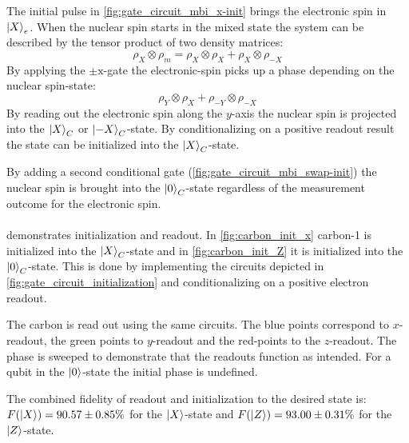 The initial pulse in \cref{fig:gate_circuit_mbi_x-init} brings the electronic spin in ${\left\vert{X}\right\rangle}_e$.
When the nuclear spin starts in the mixed state the system can be described by the tensor product of two density matrices:
\begin{equation}
    \rho_X \otimes \rho_m = \rho_X \otimes \rho_{X} +\rho_X \otimes \rho_{-X}
\end{equation}
By applying the $\pm{\mathrm{x}}$-gate  the electronic-spin picks up a phase depending on the nuclear spin-state:
\begin{equation}
     \rho_Y \otimes \rho_{X} +\rho_{-Y} \otimes \rho_{-X}
\end{equation}
By reading out the electronic spin along the $y$-axis the nuclear spin is projected into the ${\left\vert{X}\right\rangle}_C$ or ${\left\vert{-X}\right\rangle}_C$-state.
By conditionalizing on a positive readout result the state can be initialized into the ${\left\vert{X}\right\rangle}_C$-state.

By adding a second conditional gate (\cref{fig:gate_circuit_mbi_swap-init}) the nuclear spin is brought into the ${\left\vert{0}\right\rangle}_C$-state regardless of the measurement outcome for the electronic spin.

\paragraph{}
 demonstrates initialization and readout.
In \cref{fig:carbon_init_x} carbon-1 is initialized into the ${\left\vert{X}\right\rangle}_C$-state and in \cref{fig:carbon_init_Z} it is initialized into the ${\left\vert{0}\right\rangle}_C$-state.
This is done by implementing the circuits depicted in \cref{fig:gate_circuit_initialization} and conditionalizing on a positive electron readout.

The carbon is read out using the same circuits.
The blue points correspond to $x$-readout, the green points to $y$-readout and the red-points to the $z$-readout.
The phase is sweeped to demonstrate that the readouts function as intended.
For a qubit in the ${\left\vert{0}\right\rangle}$-state the initial phase is undefined.

The combined fidelity of readout and initialization to the desired state is: $F({\left\vert{X}\right\rangle}) = 90.57 \pm 0.85 \% $ for the ${\left\vert{X}\right\rangle}$-state and $F({\left\vert{Z}\right\rangle}) = 93.00 \pm 0.31 \%$ for the ${\left\vert{Z}\right\rangle}$-state.

